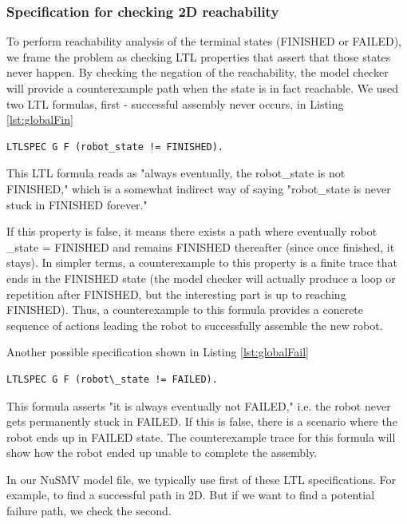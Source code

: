 \subsubsection{Specification for checking 2D reachability}

To perform reachability analysis of the terminal states (FINISHED or FAILED), 
we frame the problem as checking LTL properties that assert that those 
states never happen. By checking the negation of the reachability, 
the model checker will provide a counterexample path 
when the state is in fact reachable. 
We used two LTL formulas, first - successful assembly never occurs, in Listing \ref{lst:globalFin}

\begin{lstlisting}[language=NuSMV, caption={Terminal conditions for FINISHED and FAILED}, 
    label={lst:globalFin}]
    LTLSPEC G F (robot_state != FINISHED). 
\end{lstlisting}

This LTL formula reads as "always eventually, the robot\_state is not 
FINISHED," which is a somewhat indirect way of saying "robot\_state is 
never stuck in FINISHED forever." 

If this property is false, it means there exists a path where eventually robot
\_state = FINISHED and remains FINISHED thereafter (since once finished, 
it stays). In simpler terms, a counterexample to this property is 
a finite trace that ends in 
the FINISHED state (the model checker will actually produce a loop or 
repetition after FINISHED, but the interesting part is up to reaching FINISHED). 
Thus, a counterexample to this formula provides a concrete sequence of 
actions leading the robot to successfully assemble the new robot.

Another possible specification shown in Listing \ref{lst:globalFail}
\begin{lstlisting}[language=NuSMV, caption={Terminal conditions for FINISHED and FAILED}, 
    label={lst:globalFail}]
    LTLSPEC G F (robot\_state != FAILED). 
\end{lstlisting}
This formula asserts "it is always eventually not FAILED," i.e. the 
robot never gets permanently stuck in FAILED. If this is false, there 
is a scenario where the robot ends up in FAILED state. The counterexample trace 
for this formula will show how the robot ended up unable to complete the 
assembly.

In our NuSMV model file, we typically use first of these LTL specifications.
For example, to find a successful path in 2D.
But if we want to find a potential failure path, we check the second. 

